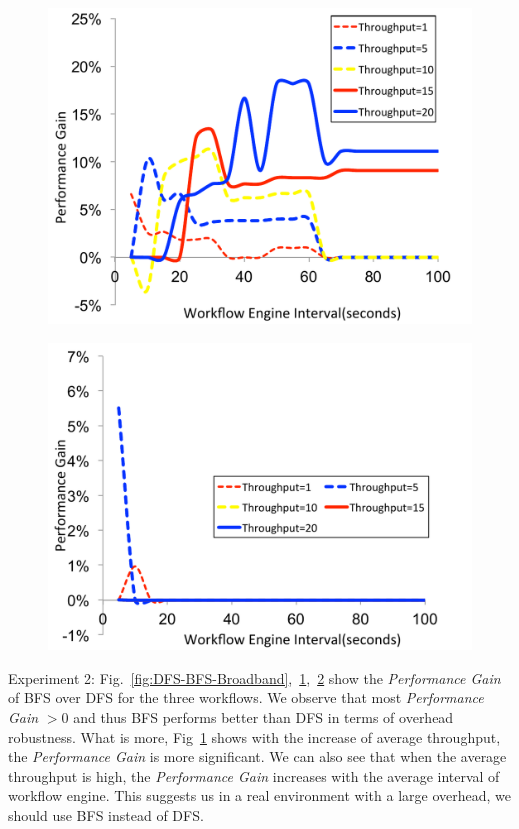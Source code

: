 \begin{figure}[!htb]
\centering
 \includegraphics[width=0.9\linewidth]{figure/DFS-BFS-CyberShake.pdf}
  \label{fig:DFS-BFS-CyberShake}
  \vspace{-10pt}
\end{figure}

\begin{figure}[!htb]
\centering
 \includegraphics[width=0.9\linewidth]{figure/DFS-BFS-Montage.pdf}
  \label{fig:DFS-BFS-Montage}
  \vspace{-10pt}
\end{figure}


Experiment 2: Fig.~\ref{fig:DFS-BFS-Broadband},~\ref{fig:DFS-BFS-CyberShake},~\ref{fig:DFS-BFS-Montage} show the \emph{Performance Gain} of BFS over DFS for the three workflows. We observe that most  \emph{Performance Gain} $>0$ and thus BFS performs better than DFS in terms of overhead robustness. What is more, Fig~\ref{fig:DFS-BFS-CyberShake} shows with the increase of average throughput, the \emph{Performance Gain} is more significant. We can also see that when the average throughput is high, the \emph{Performance Gain} increases with the average interval of workflow engine. This suggests us in a real environment with a large overhead, we should use BFS instead of DFS. 


